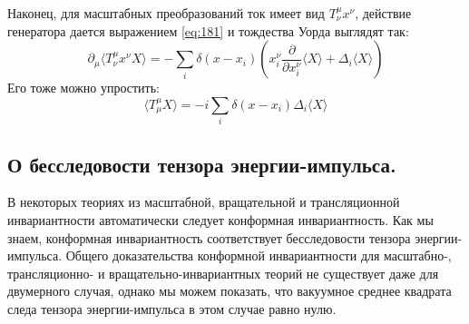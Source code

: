 \documentclass[a4paper,12pt]{article}
\theoremstyle{definition}
\theoremstyle{definition}
\theoremstyle{definition}
\begin{document}
Наконец, для масштабных преобразований ток имеет вид $T^{\mu}_{\nu}x^{\nu}$, действие генератора дается выражением \eqref{eq:181} и тождества Уорда выглядят так:
\begin{equation}
  \label{eq:212}
  \partial_{\mu}\langle T^{\mu}_{\nu} x^{\nu} X\rangle=-\sum_{i} \delta(x-x_{i}) \left( x^{\nu}_{i}\frac{\partial}{\partial x^{\nu}_{i}} \langle X\rangle+\Delta_{i} \langle X\rangle\right) 
\end{equation}
Его тоже можно упростить:
\begin{equation}
  \label{eq:213}
  \langle T^{\mu}_{\mu} X \rangle = -i \sum_{i} \delta(x-x_{i}) \Delta_{i}\langle X\rangle
\end{equation}

\subsection{О бесследовости тензора энергии-импульса.}
\label{sec:tracelessness}

В некоторых теориях из масштабной, вращательной и трансляционной инвариантности автоматически следует конформная инвариантность. Как мы знаем, конформная инвариантность соответствует бесследовости тензора энергии-импульса. Общего доказательства конформной инвариантности для масштабно-, трансляционно- и вращательно-инвариантных теорий не существует даже для двумерного случая, однако мы можем показать, что вакуумное среднее квадрата следа тензора энергии-импульса в этом случае равно нулю.
\end{document}
